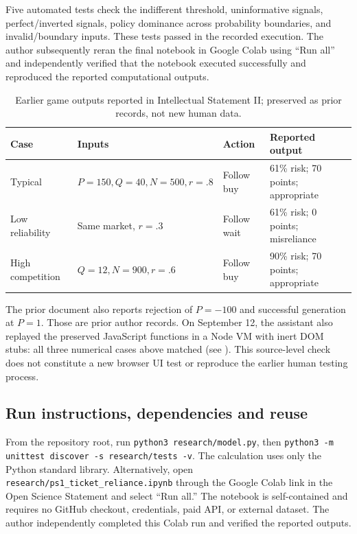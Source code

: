 Five automated tests check the indifferent threshold, uninformative signals, perfect/inverted signals, policy dominance across probability boundaries, and invalid/boundary inputs. These tests passed in the recorded execution. The author subsequently reran the final notebook in Google Colab using ``Run all'' and independently verified that the notebook executed successfully and reproduced the reported computational outputs.

\begin{table}[h]
\caption{Earlier game outputs reported in Intellectual Statement II; preserved as prior records, not new human data.}
\begin{tabularx}{\columnwidth}{@{}lYYY@{}}\toprule
Case & Inputs & Action & Reported output\\\midrule
Typical & $P=150,Q=40,N=500,r=.8$ & Follow buy & 61\% risk; 70 points; appropriate\\
Low reliability & Same market, $r=.3$ & Follow wait & 61\% risk; 0 points; misreliance\\
High competition & $Q=12,N=900,r=.6$ & Follow buy & 90\% risk; 70 points; appropriate\\\bottomrule
\end{tabularx}
\end{table}
The prior document also reports rejection of $P=-100$ and successful generation at $P=1$. Those are prior author records. On September 12, the assistant also replayed the preserved JavaScript functions in a Node VM with inert DOM stubs: all three numerical cases above matched (see ). This source-level check does not constitute a new browser UI test or reproduce the earlier human testing process.

\subsection{Run instructions, dependencies and reuse}

From the repository root, run \texttt{python3 research/model.py}, then \texttt{python3 -m unittest discover -s research/tests -v}. The calculation uses only the Python standard library. Alternatively, open \texttt{research/ps1\_ticket\_reliance.ipynb} through the Google Colab link in the Open Science Statement and select ``Run all.'' The notebook is self-contained and requires no GitHub checkout, credentials, paid API, or external dataset. The author independently completed this Colab run and verified the reported outputs.



